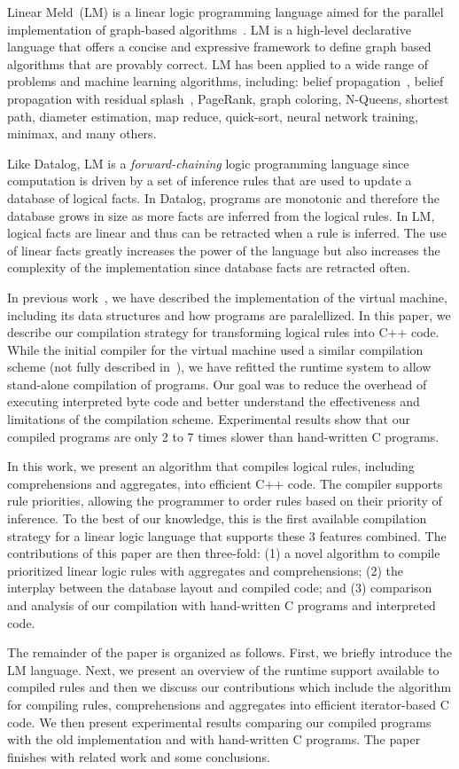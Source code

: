 Linear Meld~(LM) is a linear logic programming language aimed for the parallel
implementation of graph-based algorithms~\cite{cruz-iclp14}.  LM is a high-level
declarative language that offers a concise and expressive framework to define
graph based algorithms that are provably correct.  LM has been applied to a wide
range of problems and machine learning algorithms, including: belief
propagation~\cite{Gonzalez+al:aistats09paraml}, belief propagation with residual
splash~\cite{Gonzalez+al:aistats09paraml}, PageRank, graph coloring, N-Queens,
shortest path, diameter estimation, map reduce, quick-sort, neural network
training, minimax, and many others.

Like Datalog, LM is a \emph{forward-chaining} logic programming language since
computation is driven by a set of inference rules that are used to update a
database of logical facts.  In Datalog, programs are monotonic and therefore the
database grows in size as more facts are inferred from the logical rules. In LM,
logical facts are linear and thus can be retracted when a rule is inferred. The
use of linear facts greatly increases the power of the language but also
increases the complexity of the implementation since database facts are
retracted often.

In previous work~\cite{cruz-ppdp14}, we have described the implementation of the
virtual machine, including its data structures and how programs are
paralellized. In this paper, we describe our compilation strategy for
transforming logical rules into C++ code. While the initial compiler for the
virtual machine used a similar compilation scheme (not fully described
in~\cite{cruz-ppdp14}), we have refitted the runtime system to allow stand-alone
compilation of programs. Our goal was to reduce the overhead of executing
interpreted byte code and better understand the effectiveness and limitations of
the compilation scheme. Experimental results show that our compiled programs are
only 2 to 7 times slower than hand-written C programs.

In this work, we present an algorithm that compiles logical rules, including
comprehensions and aggregates, into efficient C++ code. The compiler supports
rule priorities, allowing the programmer to order rules based on their priority
of inference. To the best of our knowledge, this is the first available
compilation strategy for a linear logic language that supports these 3 features
combined. The contributions of this paper are then three-fold: (1) a novel
algorithm to compile prioritized linear logic rules with aggregates and
comprehensions; (2) the interplay between the database layout and compiled code;
and (3) comparison and analysis of our compilation with hand-written C programs
and interpreted code.

The remainder of the paper is organized as follows. First, we briefly introduce
the LM language. Next, we present an overview of the runtime support available
to compiled rules and then we discuss our contributions which include the
algorithm for compiling rules, comprehensions and aggregates into efficient
iterator-based C code. We then present experimental results comparing our
compiled programs with the old implementation and with hand-written C programs.
The paper finishes with related work and some conclusions.
